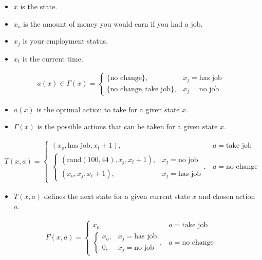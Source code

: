 \documentclass[a4paper, 12pt]{article}
\begin{document}
\begin{itemize}
  \item $x$ is the state.
  \item $x_{o}$ is the amount of money you would earn if you had a job.
  \item $x_{j}$ is your employment status.
  \item $x_{t}$ is the current time.
\end{itemize}

\[
\begin{aligned}
  a(x) \in \Gamma(x) = \begin{cases}
    \{\text{no change}\}, & x_{j} = \text{has job} \\
    \{\text{no change}, \text{take job}\}, & x_{j} = \text{no job}
  \end{cases}
\end{aligned}
\]

\begin{itemize}
  \item $a(x)$ is the optimal action to take for a given state $x$.
  \item $\Gamma(x)$ is the possible actions that can be taken for a given state $x$.
\end{itemize}

\[
\begin{aligned}
  T(x, a) = \begin{cases}
    (x_{o}, \text{has job}, x_{t} + 1), & a = \text{take job} \\
    \begin{cases}
      (\text{rand}(100, 44), x_{j}, x_{t}+1), & x_{j} = \text{no job} \\
      (x_{o}, x_{j}, x_{t}+1), & x_{j} = \text{has job}
    \end{cases}, & a = \text{no change}
  \end{cases}
\end{aligned}
\]

\begin{itemize}
  \item $T(x, a)$ defines the next state for a given current state $x$ and chosen action $a$.
\end{itemize}

\[
\begin{aligned}
  F(x, a) = \begin{cases}
    x_{o}, & a=\text{take job} \\
    \begin{cases}
      x_{o}, & x_{j}=\text{has job} \\
      0, & x_{j} = \text{no job}
    \end{cases}, & a=\text{no change}
  \end{cases}
\end{aligned}
\]
\end{document}
